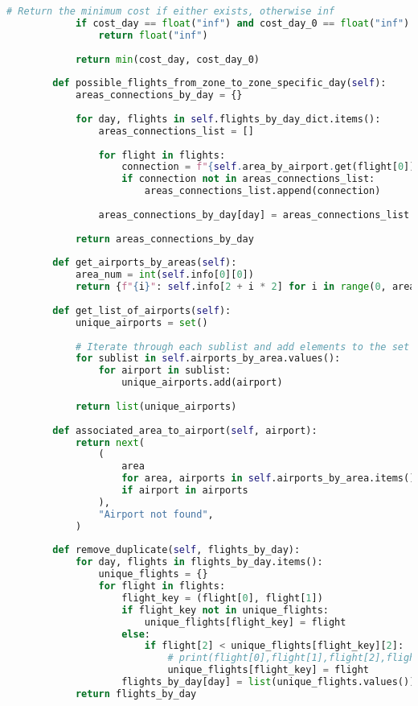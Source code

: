 \begin{lstlisting}[language = Python]
            # Return the minimum cost if either exists, otherwise inf
            if cost_day == float("inf") and cost_day_0 == float("inf"):
                return float("inf")
    
            return min(cost_day, cost_day_0)
    
        def possible_flights_from_zone_to_zone_specific_day(self):
            areas_connections_by_day = {}
    
            for day, flights in self.flights_by_day_dict.items():
                areas_connections_list = []
    
                for flight in flights:
                    connection = f"{self.area_by_airport.get(flight[0])} to {self.area_by_airport.get(flight[1])}"
                    if connection not in areas_connections_list:
                        areas_connections_list.append(connection)
    
                areas_connections_by_day[day] = areas_connections_list
    
            return areas_connections_by_day
    
        def get_airports_by_areas(self):
            area_num = int(self.info[0][0])
            return {f"{i}": self.info[2 + i * 2] for i in range(0, area_num)}
    
        def get_list_of_airports(self):
            unique_airports = set()
    
            # Iterate through each sublist and add elements to the set
            for sublist in self.airports_by_area.values():
                for airport in sublist:
                    unique_airports.add(airport)
    
            return list(unique_airports)
    
        def associated_area_to_airport(self, airport):
            return next(
                (
                    area
                    for area, airports in self.airports_by_area.items()
                    if airport in airports
                ),
                "Airport not found",
            )
    
        def remove_duplicate(self, flights_by_day):
            for day, flights in flights_by_day.items():
                unique_flights = {}
                for flight in flights:
                    flight_key = (flight[0], flight[1])
                    if flight_key not in unique_flights:
                        unique_flights[flight_key] = flight
                    else:
                        if flight[2] < unique_flights[flight_key][2]:
                            # print(flight[0],flight[1],flight[2],flight_key,unique_flights[flight_key][2])
                            unique_flights[flight_key] = flight
                    flights_by_day[day] = list(unique_flights.values())
            return flights_by_day
    

\end{lstlisting}

